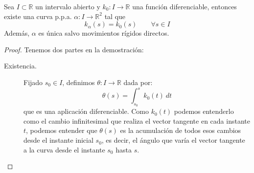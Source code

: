 \begin{teo}
    Sea $I\subset \mathbb{R}$ un intervalo abierto y $k_0:I\to \mathbb{R}$ una función diferenciable, entonces existe una curva p.p.a. $\alpha:I\to \mathbb{R}^2$ tal que
    \begin{equation*}
        k_{\alpha}(s) = k_0(s) \qquad \forall s\in I
    \end{equation*}
    Además, $\alpha$ es única salvo movimientos rígidos directos.
    \begin{proof}
        Tenemos dos partes en la demostración:
        \begin{description}
            \item [Existencia.] Fijado $s_0 \in I$, definimos $\theta:I\to \mathbb{R}$ dada por:
                \begin{equation*}
                    \theta(s) = \int_{s_0}^{s} k_0(t)~dt 
                \end{equation*}
                que es una aplicación diferenciable. Como $k_0(t)$ podemos entenderlo como el cambio infinitesimal que realiza el vector tangente en cada instante $t$, podemos entender que $\theta(s)$ es la acumulación de todos esos cambios desde el instante inicial $s_0$, es decir, el ángulo que varía el vector tangente a la curva desde el instante $s_0$ hasta $s$.


\end{description}
\end{proof}
\end{teo}
